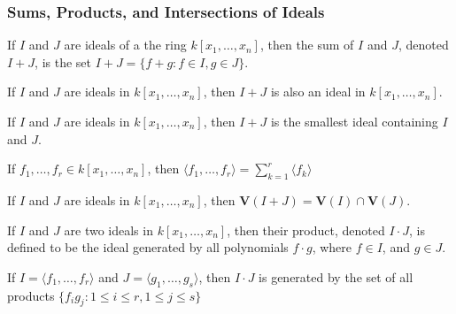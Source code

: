 \documentclass[crop=false,class=book,oneside]{standalone}
\begin{document}
            \subsubsection{Sums, Products, and Intersections of Ideals}
                \begin{definition}
                    If $I$ and $J$ are ideals of a the ring
                    $k[x_1,\hdots ,x_n]$, then the sum of $I$ and $J$,
                    denoted $I+J$, is the set
                    $I+J=\{f+g: f\in I, g\in J\}$.
                \end{definition}
                \begin{theorem}
                    If $I$ and $J$ are ideals in $k[x_1,\hdots ,x_n]$,
                    then $I+J$ is also an ideal in $k[x_1,\hdots ,x_n]$.
                \end{theorem}
                \begin{theorem}
                    If $I$ and $J$ are ideals in $k[x_1,\hdots ,x_n]$,
                    then $I+J$ is the smallest ideal containing $I$ and $J$.
                \end{theorem}
                \begin{theorem}
                    If $f_1,\hdots, f_r \in k[x_1,\hdots ,x_n]$,
                    then
                    $\langle f_1,\hdots, f_r\rangle%
                     =\sum_{k=1}^{r}\langle f_k\rangle$
                \end{theorem}
                \begin{theorem}
                    If $I$ and $J$ are ideals in
                    $k[x_1,\hdots ,x_n]$, then
                    $\mathbf{V}(I+J)=\mathbf{V}(I)\cap\mathbf{V}(J)$.
                \end{theorem}
                \begin{definition}
                    If $I$ and $J$ are two ideals in
                    $k[x_1,\hdots ,x_n]$, then their product,
                    denoted $I\cdot J$, is defined to be the ideal
                    generated by all polynomials $f\cdot g$,
                    where $f\in I$, and $g\in J$.
                \end{definition}
                \begin{theorem}
                    If $I = \langle f_1,\hdots, f_r\rangle$ and
                    $J = \langle g_1,\hdots, g_s\rangle$, then
                    $I \cdot J$ is generated by the set of all
                    products
                    $\{f_ig_j:1\leq i\leq r, 1\leq j \leq s\}$
                \end{theorem}
\end{document}
